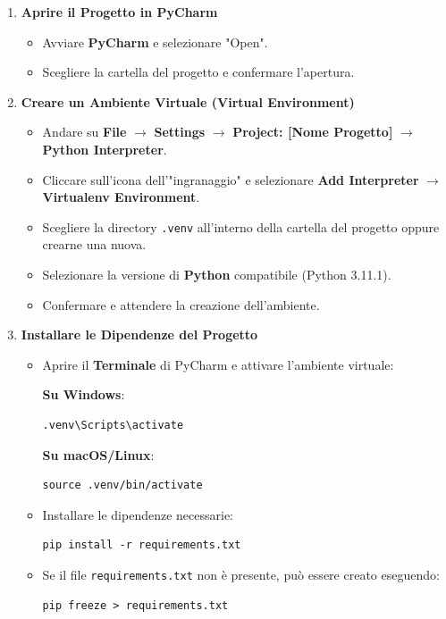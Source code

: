 \documentclass[12pt, letterpaper]{article}
\begin{document}
\begin{enumerate}
	\item \textbf{Aprire il Progetto in PyCharm}
	\begin{itemize}
		\item Avviare \textbf{PyCharm} e selezionare "Open".
		\item Scegliere la cartella del progetto e confermare l'apertura.
	\end{itemize}
	
	\item \textbf{Creare un Ambiente Virtuale (Virtual Environment)}
	\begin{itemize}
		\item Andare su \textbf{File} $\rightarrow$ \textbf{Settings} $\rightarrow$ \textbf{Project: [Nome Progetto]} $\rightarrow$ \textbf{Python Interpreter}.
		\item Cliccare sull'icona dell'"ingranaggio" e selezionare \textbf{Add Interpreter} $\rightarrow$ \textbf{Virtualenv Environment}.
		\item Scegliere la directory \texttt{.venv} all'interno della cartella del progetto oppure crearne una nuova.
		\item Selezionare la versione di \textbf{Python} compatibile (Python 3.11.1).
		\item Confermare e attendere la creazione dell'ambiente.
	\end{itemize}
	
	\item \textbf{Installare le Dipendenze del Progetto}
	\begin{itemize}
		\item Aprire il \textbf{Terminale} di PyCharm e attivare l'ambiente virtuale:
		
		\textbf{Su Windows}:
	\begin{lstlisting}
.venv\Scripts\activate
		\end{lstlisting}
		
		\textbf{Su macOS/Linux}:
		\begin{lstlisting}
source .venv/bin/activate
		\end{lstlisting}
		
		\item Installare le dipendenze necessarie:
		\begin{lstlisting}
pip install -r requirements.txt
		\end{lstlisting}
		
		\item Se il file \texttt{requirements.txt} non è presente, può essere creato eseguendo:
		\begin{lstlisting}
pip freeze > requirements.txt
		\end{lstlisting}
	\end{itemize}
\end{enumerate}
\end{document}
